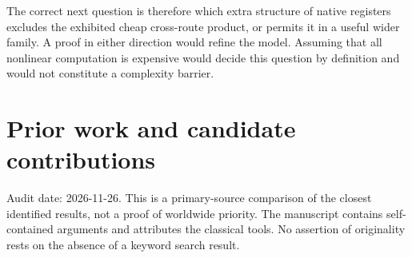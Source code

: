 \documentclass[
  11pt,
]{article}
\begin{document}
The correct next question is therefore which extra structure of native
registers excludes the exhibited cheap cross-route product, or permits
it in a useful wider family. A proof in either direction would refine
the model. Assuming that all nonlinear computation is expensive would
decide this question by definition and would not constitute a complexity
barrier.

\section{Prior work and candidate
contributions}\label{prior-work-and-candidate-contributions}

Audit date: 2026-11-26. This is a primary-source comparison of the
closest identified results, not a proof of worldwide priority. The
manuscript contains self-contained arguments and attributes the
classical tools. No assertion of originality rests on the absence of a
keyword search result.
\end{document}
